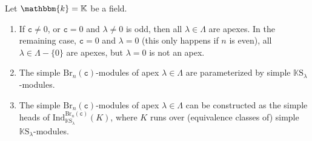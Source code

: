 \documentclass[a4paper,11pt]{amsart}
\newcommand{\setstuff}[1]{\mathrm{#1}}
\newcommand{\K}{\mathbb{K}}
\newcommand{\KK}{\mathbbm{k}}
\newcommand{\varsym}[1]{\mathtt{#1}}
\newcommand{\cvar}{\varsym{c}}
\numberwithin{equation}{section}
\begin{document}
\begin{theorem}\label{theorem:brauer}
Let $\KK=\K$ be a field.
\begin{enumerate}

\item If $\cvar\neq 0$, or $\cvar=0$ and $\lambda\neq 0$ is odd, 
then all $\lambda\in\Lambda$ are apexes. In the remaining case, 
$\cvar=0$ and $\lambda=0$ (this only happens if $n$ is even), 
all $\lambda\in\Lambda-\{0\}$ are apexes, but $\lambda=0$ is not an apex.

\item The simple $\setstuff{Br}_{n}(\cvar)$-modules of 
apex $\lambda\in\Lambda$ 
are parameterized by simple $\K\setstuff{S}_{\lambda}$-modules.

\item The simple $\setstuff{Br}_{n}(\cvar)$-modules of 
apex $\lambda\in\Lambda$ can be constructed as 
the simple heads of
$\mathrm{Ind}_{\K\setstuff{S}_{\lambda}}^{\setstuff{Br}_{n}(\cvar)}(K)$, 
where $K$ runs over (equivalence classes of) 
simple $\K\setstuff{S}_{\lambda}$-modules.

\end{enumerate}
\end{theorem}
\end{document}
